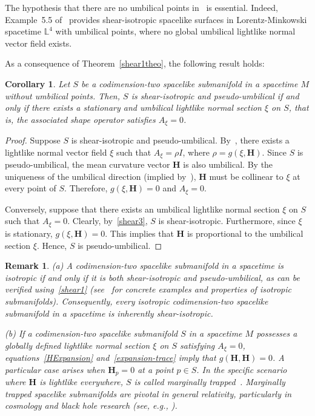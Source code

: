 \documentclass[11pt]{article}
\numberwithin{equation}{section}
\newtheorem{corollary}[theorem]{Corollary}
\newtheorem{remark}[theorem]{Remark}
\begin{document}
	
	
	
	The hypothesis that there are no umbilical points in~ is essential. Indeed, Example~5.5 of~\cite{Cab1} provides shear-isotropic spacelike surfaces in Lorentz-Minkowski spacetime $\mathbb{L}^4$ with umbilical points, where no global umbilical lightlike normal vector field exists.
	
	As a consequence of Theorem~\ref{shear1theo}, the following result holds:
	\begin{corollary}\label{shearCor}
		Let $S$ be a codimension-two spacelike submanifold in a spacetime $M$ without umbilical points. Then, $S$ is shear-isotropic and pseudo-umbilical if and only if there exists a stationary and umbilical lightlike normal section $\xi$ on $S$, that is, the associated shape operator satisfies $A_{\xi} = 0$.
	\end{corollary}
	\begin{proof}
		Suppose $S$ is shear-isotropic and pseudo-umbilical. By~, there exists a lightlike normal vector field $\xi$ such that $A_{\xi} = \rho I$, where $\rho = g(\xi, \mathbf{H})$. Since $S$ is pseudo-umbilical, the mean curvature vector $\mathbf{H}$ is also umbilical. By the uniqueness of the umbilical direction (implied by~), $\mathbf{H}$ must be collinear to $\xi$ at every point of $S$. Therefore, $g(\xi, \mathbf{H}) = 0$ and $A_{\xi} = 0$.
		
		Conversely, suppose that there exists an umbilical lightlike normal section $\xi$ on $S$ such that $A_\xi = 0$. Clearly, by~\eqref{shear3}, $S$ is shear-isotropic. Furthermore, since $\xi$ is stationary, $g(\xi, \mathbf{H}) = 0$. This implies that $\mathbf{H}$ is proportional to the umbilical section $\xi$. Hence, $S$ is pseudo-umbilical.
	\end{proof}
	
	
	
	
\begin{remark}\label{remark:stationary_umbilical}
	\normalfont
	(a) A codimension-two spacelike submanifold in a spacetime is isotropic if and only if it is both shear-isotropic and pseudo-umbilical, as can be verified using~\eqref{shear1} (see~\cite{ Cab3, Cab1, Cab2} for concrete examples and properties of isotropic submanifolds). Consequently, every isotropic codimension-two spacelike submanifold in a spacetime is inherently shear-isotropic.
	
	(b) If a codimension-two spacelike submanifold $S$ in a spacetime $M$ possesses a globally defined lightlike normal section $\xi$ on $S$ satisfying $A_{\xi} = 0$, equations~\eqref{HExpansion} and~\eqref{expansion-trace} imply that $g(\mathbf{H}, \mathbf{H}) = 0$. A particular case arises when $\mathbf{H}_p = 0$ at a point $p \in S$. In the specific scenario where $\mathbf{H}$ is lightlike everywhere, $S$ is called \emph{marginally trapped}~\cite{penrose}. Marginally trapped spacelike submanifolds are pivotal in general relativity, particularly in cosmology and black hole research (see, e.g., \cite{kupeli86}).
\end{remark}
	
\end{document}

